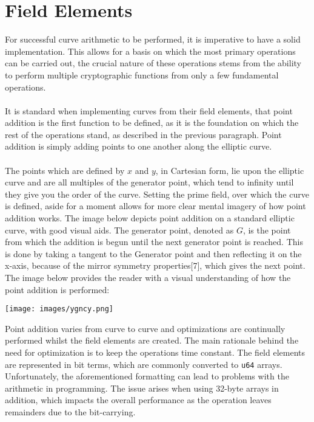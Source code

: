 \documentclass{article}
\begin{document}
\section{Field Elements}
For successful curve arithmetic to be performed, it is imperative to have a solid implementation. This allows for a basis on which the most primary operations can be carried out, the crucial nature of these operations stems from the ability to perform multiple cryptographic functions from only a few fundamental operations. \\\\
It is standard when implementing curves from their field elements, that point addition is the first function to be defined, as it is the foundation on which the rest of the operations stand, as described in the previous paragraph. Point addition is simply adding points to one another along the elliptic curve.\\\\
The points which are defined by $x$ and $y$, in Cartesian form, lie upon the elliptic curve and are all multiples of the generator point, which tend to infinity until they give you the order of the curve. Setting the prime field, over which the curve is defined, aside for a moment allows for more clear mental imagery of how point addition works. The image below depicts point addition on a standard elliptic curve, with good visual aids. The generator point, denoted as $G$, is the point from which the addition is begun until the next generator point is reached. This is done by taking a tangent to the Generator point and then reflecting it on the x-axis, because of the mirror symmetry properties[7], which gives the next point. The image below provides the reader with a visual understanding of how the point addition is performed:
\begin{center}
\texttt{[image: images/ygncy.png]}
\end{center}
Point addition varies from curve to curve and optimizations are continually performed whilst the field elements are created. The main rationale behind the need for optimization is to keep the operations time constant. The field elements are represented in bit terms, which are commonly converted to \texttt{u64} arrays. Unfortunately, the aforementioned formatting can lead to problems with the arithmetic in programming. The issue arises when using 32-byte arrays in addition, which impacts the overall performance as the operation leaves remainders due to the bit-carrying.\\\\
\end{document}
